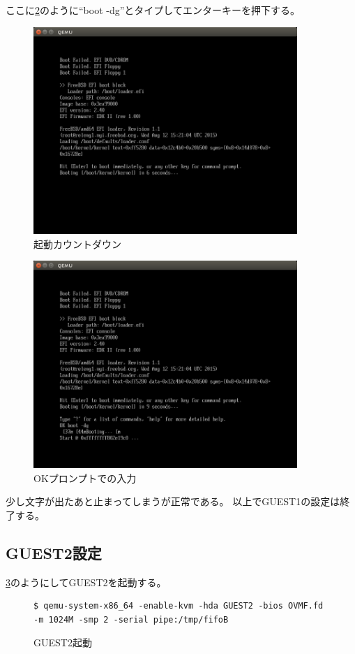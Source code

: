 \documentclass[a4j]{jarticle}
\begin{document}
\begin{multicols}{2}
ここに\ref{fig:FreeBSD_OK}のように``boot -dg''とタイプしてエンターキーを押下する。
\begin{figure}[htbp]
	\begin{center}
    	\includegraphics[width=10cm]{./IMG/FreeBSD_CNTDN.png}
	\end{center}
    \caption{起動カウントダウン}
    \label{fig:FreeBSD_CNTDN}
\end{figure}
\begin{figure}[htbp]
	\begin{center}
    	\includegraphics[width=10cm]{./IMG/FreeBSD_OK.png}
	\end{center}
    \caption{OKプロンプトでの入力}
    \label{fig:FreeBSD_OK}
\end{figure}
少し文字が出たあと止まってしまうが正常である。
以上でGUEST1の設定は終了する。

\subsection{GUEST2設定}
\ref{fig:FreeBSD_guest2}のようにしてGUEST2を起動する。
\begin{figure}[htbp]
	\begin{center}
		\begin{lstlisting}[basicstyle=\ttfamily\footnotesize, frame=single, breaklines=true]
$ qemu-system-x86_64 -enable-kvm -hda GUEST2 -bios OVMF.fd -m 1024M -smp 2 -serial pipe:/tmp/fifoB
		\end{lstlisting}
	\end{center}
	\caption{GUEST2起動}
	\label{fig:FreeBSD_guest2}
\end{figure}


\end{multicols}
\end{document}
